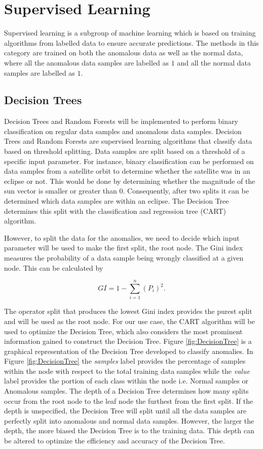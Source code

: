 \section{Supervised Learning}
Supervised learning is a subgroup of machine learning which is based on training algorithms from labelled data to ensure accurate predictions. The methods in this category are trained on both the anomalous data as well as the normal data, where all the anomalous data samples are labelled as $1$ and all the normal data samples are labelled as $1$. 

\subsection{Decision Trees}
Decision Trees and Random Forests will be implemented to perform binary classification on regular data samples and anomalous data samples. Decision Trees \cite{Reif2008} and Random Forests \cite{Shi2006, Paul2018, Primartha2018} are supervised learning algorithms that classify data based on threshold splitting. Data samples are split based on a threshold of a specific input parameter. For instance, binary classification can be performed on data samples from a satellite orbit to determine whether the satellite was in an eclipse or not. This would be done by determining whether the magnitude of the sun vector is smaller or greater than $0$. Consequently, after two splits it can be determined which data samples are within an eclipse. The Decision Tree determines this split with the classification and regression tree (CART) algorithm.

However, to split the data for the anomalies, we need to decide which input parameter will be used to make the first split, the root node. The Gini index measures the probability of a data sample being wrongly classified at a given node. This can be calculated by

\begin{equation}
GI = 1 - \sum_{i = 1}^{n}{(P_i)^2}.
\label{eq:Gini index}
\end{equation}

The operator split that produces the lowest Gini index provides the purest split and will be used as the root node. For our use case, the CART algorithm will be used to optimize the Decision Tree, which also considers the most prominent information gained to construct the Decision Tree. Figure \ref{fig:DecisionTree} is a graphical representation of the Decision Tree developed to classify anomalies. In Figure \ref{fig:DecisionTree} the \emph{samples} label provides the percentage of samples within the node with respect to the total training data samples while the \emph{value} label provides the portion of each class within the node i.e. Normal samples or Anomalous samples. The depth of a Decision Tree determines how many splits occur from the root node to the leaf node the furthest from the first split. If the depth is unspecified, the Decision Tree will split until all the data samples are perfectly split into anomalous and normal data samples. However, the larger the depth, the more biased the Decision Tree is to the training data. This depth can be altered to optimize the efficiency and accuracy of the Decision Tree.

